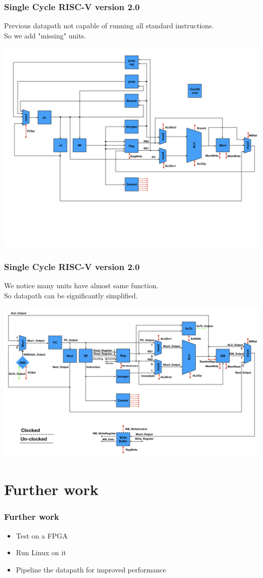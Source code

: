 \documentclass{beamer}
\begin{document}
    \begin{frame}
        \frametitle{Single Cycle RISC-V version 2.0}
        \centering
        \vspace{-0.2cm}
        Previous datapath not capable of running all standard instructions. \\
        So we add "missing" units.
        
        \includegraphics[scale=0.15]{"Pictures and plots/risc2001"} \\
    \end{frame}

    \begin{frame}
        \frametitle{Single Cycle RISC-V version 2.0}
        \centering
        \vspace{-0.2cm}
        We notice many units have almost same function. \\
        So datapath can be significantly simplified.
        
        \includegraphics[scale=0.15]{"Pictures and plots/risc2002"} \\
    \end{frame}

    
    \section{Further work}
    
    \begin{frame}
        \frametitle{Further work}
        \begin{itemize}
            \item Test on a FPGA
            \item Run Linux on it
            \item Pipeline the datapath for improved performance
        \end{itemize}   
    \end{frame}
	
\end{document}
